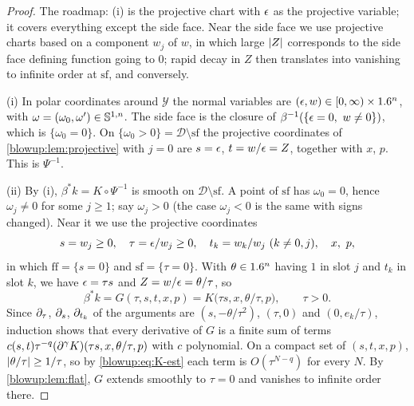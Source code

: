 \begin{proof}
The roadmap: (i) is the projective chart with $\epsilon$ as the projective variable; it
covers everything except the side face. Near the side face we use projective charts
based on a component $w_j$ of $w$, in which large $\lvert Z\rvert$ corresponds to the side face
defining function going to $0$; rapid decay in $Z$ then translates into vanishing to
infinite order at $\mathrm{sf}$, and conversely.

(i) In polar coordinates around $\mathcal Y$ the normal variables are $(\epsilon,w)\in
[0,\infty)\times1.6^n$, with $\omega=(\omega_0,\omega')\in\mathbb{S}^{1,n}$. The side face is
the closure of $\beta^{-1}(\{\epsilon=0,\ w\ne0\})$, which is $\{\omega_0=0\}$. On
$\{\omega_0>0\}=\mathcal D\setminus\mathrm{sf}$ the projective coordinates of
\cref{blowup:lem:projective} with $j=0$ are $s=\epsilon$, $t=w/\epsilon=Z$, together with $x$,
$p$. This is $\Psi^{-1}$.

(ii) By (i), $\beta^*k=K\circ\Psi^{-1}$ is smooth on $\mathcal D\setminus\mathrm{sf}$. A point
of $\mathrm{sf}$ has $\omega_0=0$, hence $\omega_j\ne0$ for some $j\ge1$; say $\omega_j>0$
(the case $\omega_j<0$ is the same with signs changed). Near it we use the projective
coordinates
\begin{equation*}
  s=w_j\ge0,\quad\tau=\epsilon/w_j\ge0,\quad t_k=w_k/w_j\ (k\ne0,j),\quad x,\ p,
\end{equation*}
in which $\mathrm{ff}=\{s=0\}$ and $\mathrm{sf}=\{\tau=0\}$. With $\theta\in1.6^n$ having $1$ in slot $j$
and $t_k$ in slot $k$, we have $\epsilon=\tau s$ and $Z=w/\epsilon=\theta/\tau$, so
\begin{equation*}
  \beta^*k=G(\tau,s,t,x,p)=K\big(\tau s,x,\theta/\tau,p\big),\qquad\tau>0.
\end{equation*}
Since $\partial_\tau$, $\partial_s$, $\partial_{t_k}$ of the arguments are $(s,-\theta/\tau^2)$,
$(\tau,0)$ and $(0,e_k/\tau)$, induction shows that every derivative of $G$ is a finite
sum of terms $c(s,t)\tau^{-q}(\partial^\gamma K)(\tau s,x,\theta/\tau,p)$ with $c$ polynomial.
On a compact set of $(s,t,x,p)$, $\lvert \theta/\tau\rvert\ge1/\tau$, so by \eqref{blowup:eq:K-est}
each term is $O(\tau^{N-q})$ for every $N$. By \cref{blowup:lem:flat}, $G$ extends
smoothly to $\tau=0$ and vanishes to infinite order there.


\end{proof}
